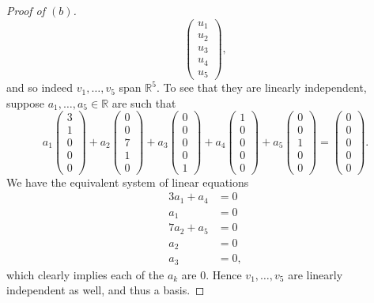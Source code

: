 \documentclass[11pt]{extarticle}
\newcommand{\R}{\mathbb{R}}
\begin{document}
\begin{proof}[Proof of $(b)$]
\begin{equation*}
\begin{pmatrix} u_1 \\ u_2 \\ u_3 \\ u_4\\ u_5 \end{pmatrix},
\end{equation*}
and so indeed $v_1,\dots, v_5$ span $\R^5$.  To see that they are linearly independent, suppose $a_1,\dots,a_5\in\R$ are such that 
\begin{equation*}
a_1\begin{pmatrix}3\\1\\0\\0\\0\end{pmatrix} + a_2\begin{pmatrix}0\\0\\7\\1\\0\end{pmatrix} + a_3\begin{pmatrix}0\\0\\0\\0\\1\end{pmatrix} + a_4\begin{pmatrix}1\\0\\0\\0\\0\end{pmatrix} + a_5\begin{pmatrix}0\\0\\1\\0\\0\end{pmatrix} = \begin{pmatrix}0\\0\\0\\0\\0\end{pmatrix}.
\end{equation*}
We have the equivalent system of linear equations
\begin{align*}
3a_1 + a_4 &= 0\\
a_1 &= 0\\
7a_2 + a_5 &= 0\\
a_2 &= 0\\
a_3 &= 0,
\end{align*}
which clearly implies each of the $a_k$ are $0$.  Hence $v_1,\dots,v_5$ are linearly independent as well, and thus a basis.
\end{proof}
\end{document}
